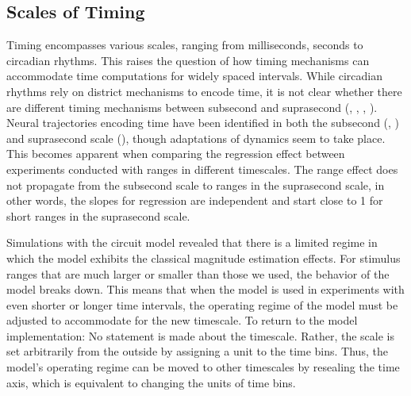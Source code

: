 \documentclass[10pt]{article}
\begin{document}
\subsection{Scales of Timing}
Timing encompasses various scales, ranging from milliseconds, seconds to circadian rhythms. This raises the question of how timing mechanisms can accommodate time computations for widely spaced intervals. 
While circadian rhythms rely on district mechanisms to encode time, it is not clear whether there are different timing mechanisms between subsecond and suprasecond (\cite{Buonomano2002}, \cite{Buonomano2007}, \cite{Paton2018}, \cite{Tsao2022}). %
Neural trajectories encoding time have been identified in both the subsecond (\cite{Sohn2019}, \cite{Meirhaeghe2021}) and suprasecond scale (\cite{Henke2021}), though adaptations of dynamics seem to take place.
This becomes apparent when comparing the regression effect between experiments conducted with ranges in different timescales. 
The range effect does not propagate from the subsecond scale to ranges in the suprasecond scale, in other words, the slopes for regression are independent and start close to 1 for short ranges in the suprasecond scale. 

Simulations with the circuit model revealed that there is a limited regime in which the model exhibits the classical magnitude estimation effects. 
For stimulus ranges that are much larger or smaller than those we used, the behavior of the model breaks down.
This means that when the model is used in experiments with even shorter or longer time intervals, the operating regime of the model must be adjusted to accommodate for the new timescale.
To return to the model implementation: No statement is made about the timescale.  Rather, the scale is set arbitrarily from the outside by assigning a unit to the time bins. Thus, the model's operating regime can be moved to other timescales by resealing the time axis, which is equivalent to changing the units of time bins.
\end{document}
